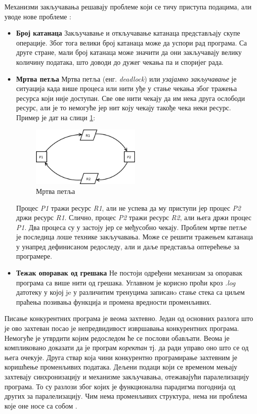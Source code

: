 \documentclass[12pt,oneside]{memoir}
\begin{document}
Механизми закључавања решавају проблеме који се тичу приступа подацима, али уводе нове проблеме \cite{progInScala3, microsoftRaceC}:
\begin{itemize}
\item \textbf{Број катанаца} Закључавање и откључавање катанаца представљају скупе операције. Због тога велики број катанаца може да успори рад програма. Са друге стране, мали број катанаца може значити да они закључавају велику количину података, што доводи до дужег чекања па и споријег рада. 
\item \textbf{Мртва петља} Мртва петља (енг. \textit{deadlock}) или \textit{узајамно закључавање} је ситуација када више процеса или нити уђе у стање чекања због тражења ресурса који није доступан. Све ове нити чекају да им нека друга ослободи ресурс, али је то немогуће јер нит коју чекају такође чека неки ресурс. Пример је дат на слици \ref{fig:deadlock}:
\begin{figure}[!ht]
  \centering
  \includegraphics[width=0.5\textwidth]{deadlock.png}
  \caption{Мртва петља}
  \label{fig:deadlock}
\end{figure}
Процес \textit{P1} тражи ресурс \textit{R1}, али не успева да му приступи јер процес \textit{P2} држи ресурс \textit{R1}. Слично, процес \textit{P2} тражи ресурс \textit{R2}, али њега држи процес \textit{P1}. Два процеса су у застоју јер се међусобно чекају. Проблем мртве петље је последица лоше технике закључавања. Може се решити тражењем катанаца у унапред дефинисаном редоследу, али и даље представља оптерећење за програмере.

\label{raceCon}
\item \textbf{Тежак опоравак од грешака} Не постоји одређени механизам за опоравак програма са више нити од грешака. Углавном је корисно проћи кроз \textit{.log} датотеку у којој je у различитим тренуцима записанo стање стека са циљем праћења позивања функција и промена вредности променљивих.
\end{itemize}

Писање конкурентних програма је веома захтевно. Један од основних разлога што је ово захтеван посао је непредвидивост извршавања конкурентних програма. Немогуће је утврдити којим редоследом ће се послови обављати. Веома је компликовано доказати да је програм \textit{коректан} тј. да ради управо оно што се од њега очекује. Друга ствар која чини конкурентно програмирање захтевним је коришћење променљивих података. Дељени подаци који се временом мењају захтевају синхронизацију и механизме закључавања, отежавајући паралелизацију програма. То су разлози због којих је функционална парадигма погоднија од других за паралелизацију. Чим нема променљивих структура, нема ни проблема које оне носе са собом \cite{progInScala3}.
\end{document}
